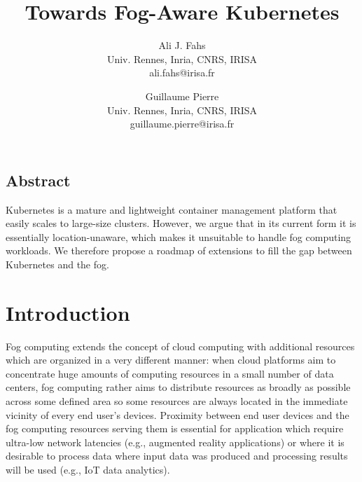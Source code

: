 \documentclass[letterpaper,twocolumn,10pt]{article}
\begin{document}
\date{}
\title{\Large \bf Towards Fog-Aware Kubernetes}
\author{
{\rm Ali J. Fahs}\\
Univ. Rennes, Inria, CNRS, IRISA\\
ali.fahs@irisa.fr
\and
{\rm Guillaume Pierre}\\
Univ. Rennes, Inria, CNRS, IRISA\\
guillaume.pierre@irisa.fr
}
\maketitle
\thispagestyle{empty}


\subsection*{Abstract}

Kubernetes is a mature and lightweight container management platform
that easily scales to large-size clusters. However, we argue that in
its current form it is essentially location-unaware, which makes it
unsuitable to handle fog computing workloads. We therefore propose a
roadmap of extensions to fill the gap between Kubernetes and the fog.

\section{Introduction}

Fog computing extends the concept of cloud computing with additional
resources which are organized in a very different manner: when cloud
platforms aim to concentrate huge amounts of computing resources in a
small number of data centers, fog computing rather aims to distribute
resources as broadly as possible across some defined area so some
resources are always located in the immediate vicinity of every end
user's devices. Proximity between end user devices and the fog
computing resources serving them is essential for application which
require ultra-low network latencies (e.g., augmented reality
applications) or where it is desirable to process data where input
data was produced and processing results will be used (e.g., IoT data
analytics).


\end{document}
